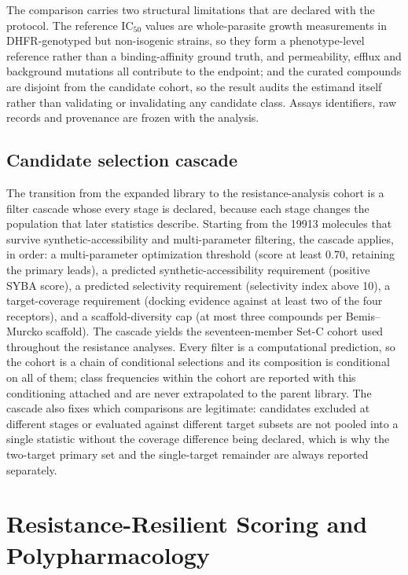 The comparison carries two structural limitations that are declared with the protocol. The reference IC$_{50}$ values are whole-parasite growth measurements in DHFR-genotyped but non-isogenic strains, so they form a phenotype-level reference rather than a binding-affinity ground truth, and permeability, efflux and background mutations all contribute to the endpoint; and the curated compounds are disjoint from the candidate cohort, so the result audits the estimand itself rather than validating or invalidating any candidate class. Assays identifiers, raw records and provenance are frozen with the analysis.

\subsection{Candidate selection cascade}

The transition from the expanded library to the resistance-analysis cohort is a filter cascade whose every stage is declared, because each stage changes the population that later statistics describe. Starting from the \num{19913} molecules that survive synthetic-accessibility and multi-parameter filtering, the cascade applies, in order: a multi-parameter optimization threshold (score at least \num{0.70}, retaining the primary leads), a predicted synthetic-accessibility requirement (positive SYBA score), a predicted selectivity requirement (selectivity index above \num{10}), a target-coverage requirement (docking evidence against at least two of the four receptors), and a scaffold-diversity cap (at most three compounds per Bemis--Murcko scaffold). The cascade yields the seventeen-member Set-C cohort used throughout the resistance analyses. Every filter is a computational prediction, so the cohort is a chain of conditional selections and its composition is conditional on all of them; class frequencies within the cohort are reported with this conditioning attached and are never extrapolated to the parent library. The cascade also fixes which comparisons are legitimate: candidates excluded at different stages or evaluated against different target subsets are not pooled into a single statistic without the coverage difference being declared, which is why the two-target primary set and the single-target remainder are always reported separately.

\section{Resistance-Resilient Scoring and Polypharmacology}\label{sec:rrs_methods}


